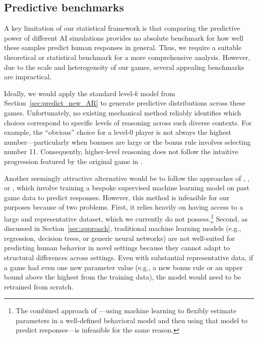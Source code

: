 \subsection{Predictive benchmarks}
\label{sec:nash-selector}

A key limitation of our statistical framework is that comparing the predictive power of different AI simulations provides no absolute benchmark for how well these samples predict human responses in general. 
Thus, we require a suitable theoretical or statistical benchmark for a more comprehensive analysis.
However, due to the scale and heterogeneity of our games, several appealing benchmarks are impractical.

Ideally, we would apply the standard level-$k$ model from Section~\ref{sec:predict_new_AR} to generate predictive distributions across these games. 
Unfortunately, no existing mechanical method reliably identifies which choices correspond to specific levels of reasoning across such diverse contexts. 
For example, the ``obvious'' choice for a level-$0$ player is not always the highest number---particularly when bonuses are large or the bonus rule involves selecting number 11. 
Consequently, higher-level reasoning does not follow the intuitive progression featured by the original game in \citeauthor{1120Arad2012}.

Another seemingly attractive alternative would be to follow the approaches of \cite{FudenbergLiang2019PredictPlay}, \cite{hirasawa2022using}, or \cite{andrews2025transfer}, which involve training a bespoke supervised machine learning model on past game data to predict responses. 
However, this method is infeasible for our purposes because of two problems. 
First, it relies heavily on having access to a large and representative dataset, which we currently do not possess.\footnote{The combined approach of \cite{zhu2025capturing}---using machine learning to flexibly estimate parameters in a well-defined behavioral model and then using that model to predict responses---is infeasible for the same reason.} 
Second, as discussed in Section~\ref{sec:approach}, traditional machine learning models (e.g., regression, decision trees, or generic neural networks) are not well-suited for predicting human behavior in novel settings because they cannot adapt to structural differences across settings.
Even with substantial representative data, if a game had even one new parameter value (e.g., a new bonus rule or an upper bound above the highest from the training data), the model would need to be retrained from scratch.

